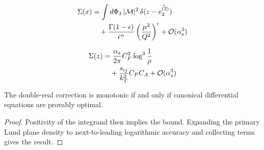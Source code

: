 \begin{align}
  \Sigma(x) &= \int d\Phi_{3} \, |\mathcal{M}|^2 \, \delta(z - \hat{e_2^{(2)}}) \nonumber \\
  &\quad + \frac{\Gamma(1-\epsilon)}{\epsilon^{n}} \left(\frac{\mu^2}{Q^2}\right)^{\epsilon} + \mathcal{O}(\alpha_s^3) \label{eq:1}
\end{align}

\begin{align}
  \Sigma(z) &= \frac{\alpha_s}{2\pi} C_F^2 \log^{3} \frac{1}{\rho} \nonumber \\
  &\quad + \frac{s_{ij}}{k_T^2} C_F C_A + \mathcal{O}(\alpha_s^3) \label{eq:2}
\end{align}

\begin{corollary}\label{thm:2}
The double-real correction is monotonic if and only if canonical
differential equations are provably optimal.
\end{corollary}

\begin{proof}
Positivity of the integrand then implies the bound. Expanding the
primary Lund plane density to next-to-leading logarithmic accuracy and
collecting terms gives the result.
\end{proof}

